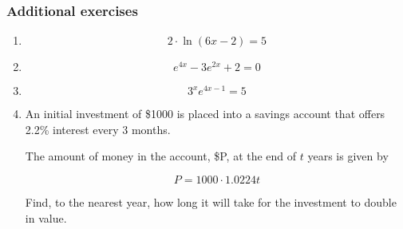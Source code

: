 \subsubsection{Additional exercises}\label{subsec:additional_log}

\begin{enumerate}
\item  
\[
2\cdot \ln(6x - 2) = 5
\]

\item 
\[
e^{4x} - 3e^{2x} + 2 = 0
\]

\item 
\[
3^xe^{4x-1} = 5
\]

\item 

An initial investment of \$1000 is placed into a savings account that offers 2.2\% interest
every 3 months. 

The amount of money in the account, \$P, at the end of $t$ years is given by 

\[
P = 1000 \cdot 1.0224t
\]

Find, to the nearest year, how long it will take for the investment to double in value. 


\end{enumerate}

\pagebreak

